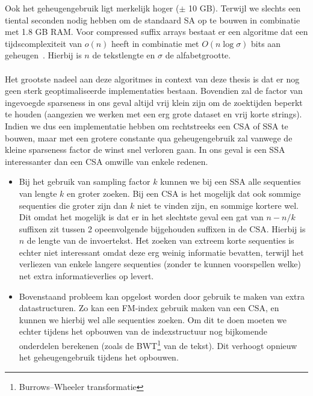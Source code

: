 Ook het geheugengebruik ligt merkelijk hoger ($\pm$ 10 GB).
Terwijl we slechts een tiental seconden nodig hebben om de standaard SA op te bouwen in combinatie met 1.8 GB RAM\@.
Voor compressed suffix arrays bestaat er een algoritme dat een tijdscomplexiteit van $o(n)$ heeft in combinatie met $O(n \log \sigma)$ bits aan geheugen~\cite{building_compressed_sa}.
Hierbij is $n$ de tekstlengte en $\sigma$ de alfabetgrootte.
\\ \\
Het grootste nadeel aan deze algoritmes in context van deze thesis is dat er nog geen sterk geoptimaliseerde implementaties bestaan.
Bovendien zal de factor van ingevoegde sparseness in ons geval altijd vrij klein zijn om de zoektijden beperkt te houden (aangezien we werken met een erg grote dataset en vrij korte strings).
Indien we dus een implementatie hebben om rechtstreeks een CSA of SSA te bouwen, maar met een grotere constante qua geheugengebruik zal vanwege de kleine sparseness factor de winst snel verloren gaan.
In ons geval is een SSA interessanter dan een CSA omwille van enkele redenen.
\begin{itemize}
    \item Bij het gebruik van sampling factor $k$ kunnen we bij een SSA alle sequenties van lengte $k$ en groter zoeken.
    Bij een CSA is het mogelijk dat ook sommige sequenties die groter zijn dan $k$ niet te vinden zijn, en sommige kortere wel.
    Dit omdat het mogelijk is dat er in het slechtste geval een gat van $n - n/k$ suffixen zit tussen 2 opeenvolgende bijgehouden suffixen in de CSA.
    Hierbij is $n$ de lengte van de invoertekst.
    Het zoeken van extreem korte sequenties is echter niet interessant omdat deze erg weinig informatie bevatten, terwijl het verliezen van enkele langere sequenties (zonder te kunnen voorspellen welke) net extra informatieverlies op levert.
    \item Bovenstaand probleem kan opgelost worden door gebruik te maken van extra datastructuren.
    Zo kan een FM-index\cite{fm_index} gebruik maken van een CSA, en kunnen we hierbij wel alle sequenties zoeken.
    Om dit te doen moeten we echter tijdens het opbouwen van de indexstructuur nog bijkomende onderdelen berekenen (zoals de BWT\footnote{Burrows–Wheeler transformatie} van de tekst).
    Dit verhoogt opnieuw het geheugengebruik tijdens het opbouwen.
\end{itemize}


